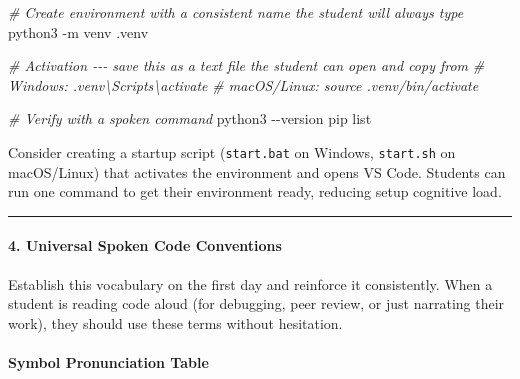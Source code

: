 \documentclass[
  justified,
  openright,
]{tufte-book}
\let\subsection\paragraph
\let\paragraph\paragraph
\newcommand{\CommentTok}[1]{\textcolor{CodeComment}{\textit{#1}}}  %
\newcommand{\CodeTypeTok}[1]{\textcolor{CodeType}{#1}}              %
\newenvironment{Shaded}{%
  \begin{mdframed}[style=TufteCode]%
}{%
  \end{mdframed}%
}
\let\subsection\paragraph
\let\paragraph\paragraph
\begin{document}
\begin{Shaded}
\begin{Highlighting}[]
\CommentTok{\# Create environment with a consistent name the student will always type}
python3 \CodeTypeTok{{-}m} venv .venv
 
\CommentTok{\# Activation {-}{-}{-} save this as a text file the student can open and copy from}
\CommentTok{\# Windows: .venv\textbackslash{}Scripts\textbackslash{}activate}
\CommentTok{\# macOS/Linux: source .venv/bin/activate}
 
\CommentTok{\# Verify with a spoken command}
python3 \CodeTypeTok{{-}{-}version}
pip list
\end{Highlighting}
\end{Shaded}

Consider creating a startup script (\texttt{start.bat} on Windows,
\texttt{start.sh} on macOS/Linux) that activates the environment and
opens VS Code.
 Students can run one command to get their environment
ready, reducing setup cognitive load.

\begin{center}\rule{0.5\linewidth}{0.5pt}\end{center}

\subsection{4. Universal Spoken Code
Conventions}\label{universal-spoken-code-conventions}

Establish this vocabulary on the first day and reinforce it
consistently. When a student is reading code aloud (for debugging, peer
review, or just narrating their work), they should use these terms
without hesitation.

\subsection{Symbol Pronunciation
Table}\label{symbol-pronunciation-table}
\end{document}
